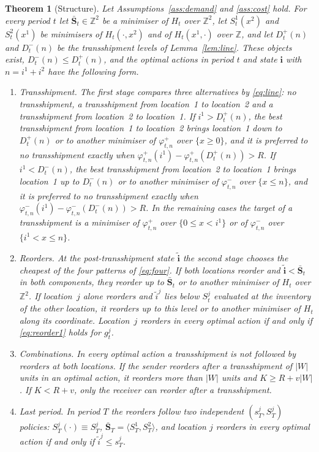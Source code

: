 \documentclass[11pt]{article}
\renewcommand{\vec}[1]{\boldsymbol{#1}}
\newcommand{\Z}{\mathbb{Z}}
\newtheorem{theorem}{Theorem}
\theoremstyle{definition}
\begin{document}
\begin{theorem}[Structure]\label{thm:structure}
Let Assumptions~\ref{ass:demand} and \ref{ass:cost} hold. For every period $t$ let $\bar{\vec{S}}_t\in\Z^2$ be a minimiser of $H_t$ over $\Z^2$, let $S^1_t(x^2)$ and $S^2_t(x^1)$ be minimisers of $H_t(\cdot,x^2)$ and of $H_t(x^1,\cdot)$ over $\Z$, and let $D^+_t(n)$ and $D^-_t(n)$ be the transshipment levels of Lemma~\ref{lem:line}. These objects exist, $D^-_t(n)\le D^+_t(n)$, and the optimal actions in period $t$ and state $\vec{i}$ with $n=i^1+i^2$ have the following form.
\begin{enumerate}[label=(\alph*)]
\item \emph{Transshipment.} The first stage compares three alternatives by \eqref{eq:line}: no transshipment, a transshipment from location~1 to location~2 and a transshipment from location~2 to location~1. If $i^1>D^+_t(n)$, the best transshipment from location~1 to location~2 brings location~1 down to $D^+_t(n)$ or to another minimiser of $\varphi^+_{t,n}$ over $\{x\ge0\}$, and it is preferred to no transshipment exactly when $\varphi^+_{t,n}(i^1)-\varphi^+_{t,n}(D^+_t(n))>R$. If $i^1<D^-_t(n)$, the best transshipment from location~2 to location~1 brings location~1 up to $D^-_t(n)$ or to another minimiser of $\varphi^-_{t,n}$ over $\{x\le n\}$, and it is preferred to no transshipment exactly when $\varphi^-_{t,n}(i^1)-\varphi^-_{t,n}(D^-_t(n))>R$. In the remaining cases the target of a transshipment is a minimiser of $\varphi^+_{t,n}$ over $\{0\le x<i^1\}$ or of $\varphi^-_{t,n}$ over $\{i^1<x\le n\}$.
\item \emph{Reorders.} At the post-transshipment state $\tilde{\vec{i}}$ the second stage chooses the cheapest of the four patterns of \eqref{eq:four}. If both locations reorder and $\tilde{\vec{i}}<\bar{\vec{S}}_t$ in both components, they reorder up to $\bar{\vec{S}}_t$ or to another minimiser of $H_t$ over $\Z^2$. If location~$j$ alone reorders and $\tilde{i}^j$ lies below $S^j_t$ evaluated at the inventory of the other location, it reorders up to this level or to another minimiser of $H_t$ along its coordinate. Location~$j$ reorders in every optimal action if and only if \eqref{eq:reorder1} holds for $g^j_t$.
\item \emph{Combinations.} In every optimal action a transshipment is not followed by reorders at both locations. If the sender reorders after a transshipment of $|W|$ units in an optimal action, it reorders more than $|W|$ units and $K\ge R+v|W|$. If $K<R+v$, only the receiver can reorder after a transshipment.
\item \emph{Last period.} In period $T$ the reorders follow two independent $(s^j_T,S^j_T)$ policies: $S^j_T(\cdot)\equiv S^j_T$, $\bar{\vec{S}}_T=\langle S^1_T,S^2_T\rangle$, and location $j$ reorders in every optimal action if and only if $\tilde{i}^j\le s^j_T$.
\end{enumerate}
\end{theorem}
\end{document}

